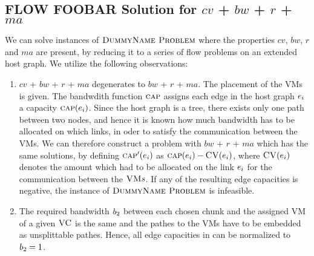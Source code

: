 \subsection{FLOW FOOBAR Solution for $cv$ + $bw$ + $r$ + $ma$}

We can solve instances of $\textsc{DummyName Problem}$ where the properties $cv$, $bw$, $r$ and 
$ma$
are present, by reducing it to a series of flow problems on an extended 
host graph. We utilize the following observations:

\newcommand{\Source}{\ensuremath{s}}
\newcommand{\Sink}{\ensuremath{t}}

\begin{enumerate}
\item $cv$ + $bw$ + $r$ + $ma$ degenerates to  $bw$ + $r$ + $ma$. 
The placement of the VMs is given. The bandwdith function $\textsc{cap}$ assigns 
each edge in the host graph $e_i$ a capacity 
$\textsc{cap}(e_i)$. Since the 
host graph is a tree, there exists only one path between two nodes, and hence 
it is known how much bandwidth has to be allocated on which links, in oder to 
satisfy the communication between the VMs. We can therefore construct a 
problem with $bw$ + $r$ + $ma$ which has the same solutions, by defining 
$\textsc{cap}'(e_i)$ as 
$\textsc{cap}(e_i) - \textsc{CV}(e_i)$, where 
$\textsc{CV}(e_i)$ denotes the amount which 
had to be allocated on the link $e_i$ for the communication 
between the $\textsc{VM} s$. If any of the resulting edge capacities is negative, the 
instance of $\textsc{DummyName Problem}$ is infeasible.
\item The required bandwidth $b_2$ between each chosen chunk and the 
assigned VM of a given $\textsc{VC}$ is 
the same and the pathes to the VMs have to be embedded as unsplittable 
pathes. Hence, all edge capacities in can be normalized to $b_2 = 1$.
\begin{comment}
\item For a (by model) fixed node mapping $\NodeMapping$ and a given chunks to 
vm assignment $\VmChunkAssignment$, the computation of a cost 
optimal link mapping can be reduced to an integral minimal cost multi-commodity 
flow problem, where each VM $\VirtualNode_i$ has a flow demand of $1$ to each 
of its assigned chunks $\VmChunkAssignment(\VirtualNode_i)$. 

\end{comment}
\end{enumerate}
